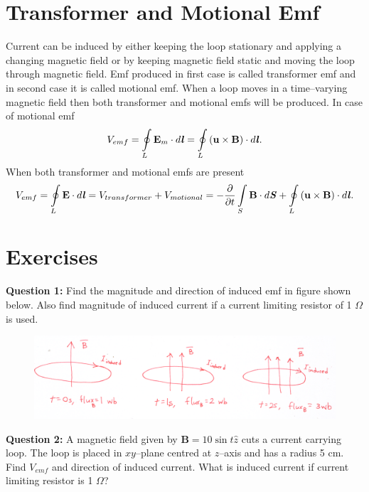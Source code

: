 \documentclass[12pt,a4paper]{article}
\begin{document}
\section{Transformer and Motional Emf}
Current can be induced by either keeping the loop stationary and applying a changing magnetic field or by keeping magnetic field static and moving the loop through magnetic field. Emf produced in first case is called transformer emf and in second case it is called motional emf. When a loop moves in a time--varying magnetic field then both transformer and motional emfs will be produced. In case of motional emf
\begin{equation}
V_{emf}=\oint\limits_{L}\textbf{E}_m\cdot d\textbf{\textit{l}}=\oint\limits_{L}\left(\textbf{u}\times\textbf{B}\right)\cdot d\textbf{\textit{l}}.
\end{equation}
When both transformer and motional emfs are present
\begin{equation}
V_{emf}=\oint\limits_{L}\textbf{E}\cdot d\textbf{\textit{l}}=V_{transformer}+V_{motional}=-\dfrac{\partial}{\partial t}\int\limits_{S}\textbf{B}\cdot d\textbf{\textit{S}}+\oint\limits_{L}\left(\textbf{u}\times\textbf{B}\right)\cdot d\textbf{\textit{l}}.
\end{equation}
\newpage
\section{Exercises}
\noindent\textbf{Question 1:} Find the magnitude and direction of induced emf in figure shown below. Also find magnitude of induced current if a current limiting resistor of 1 $\Omega$ is used.
\begin{figure}[H]
\centering
\includegraphics[width=\textwidth]{ChangingFlux.png}
\label{Changing-Flux}
\end{figure}
\noindent\textbf{Question 2:} A magnetic field given by $\textbf{B}=10\sin t\hat z$ cuts a current carrying loop. The loop is placed in $xy$--plane centred at $z$--axis and has a radius 5 cm. Find $V_{emf}$ and direction of induced current. What is induced current if current limiting resistor is 1 $\Omega$?


\end{document}

